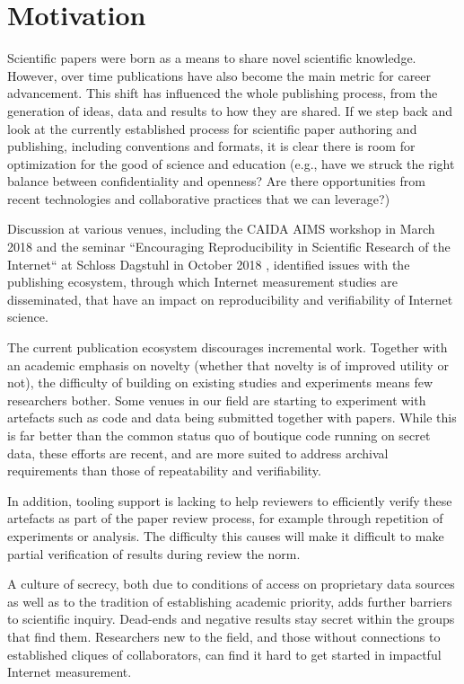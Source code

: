 \documentclass[sigconf]{acmart}
\begin{document}
\section{Motivation}
\label{sec:intro}

Scientific papers were born as a means to share novel scientific knowledge.
However, over time publications have also become the main metric for career
advancement. This shift has influenced the whole publishing process, from the
generation of ideas, data and results to how they are shared. If we step back
and look at the currently established process for scientific paper authoring and
publishing, including conventions and formats, it is clear there is room for
optimization for the good of science and education (e.g.,  have we struck the
right balance between confidentiality and openness? Are there opportunities from
recent technologies and collaborative practices that we can leverage?)

Discussion at various venues, including the CAIDA AIMS workshop in March 2018
\cite{aims-presentation} and the seminar ``Encouraging Reproducibility in
Scientific Research of the Internet`` at Schloss Dagstuhl in October 2018
\cite{dagstuhl-site}, identified issues with the publishing ecosystem, through
which Internet measurement studies are disseminated, that have an impact on
reproducibility and verifiability of Internet science.

The current publication ecosystem discourages incremental work. Together with an
academic emphasis on novelty (whether that novelty is of improved utility or
not), the difficulty of building on existing studies and experiments means few
researchers bother. Some venues in our field are starting to experiment with
artefacts such as code and data being submitted together with papers. While this
is far better than the common status quo of boutique code running on secret
data, these efforts are recent, and are more suited to address archival
requirements than those of repeatability and verifiability. 

In addition, tooling support is lacking to help reviewers to efficiently verify
these artefacts as part of the paper review process, for example through
repetition of experiments or analysis. The difficulty this causes will make it
difficult to make partial verification of results during review the norm.

A culture of secrecy, both due to conditions of access on proprietary data
sources as well as to the tradition of establishing academic priority, adds
further barriers to scientific inquiry. Dead-ends and negative results stay
secret within the groups that find them. Researchers new to the field, and those
without connections to established cliques of collaborators, can find it hard to
get started in impactful Internet measurement. 
\end{document}
